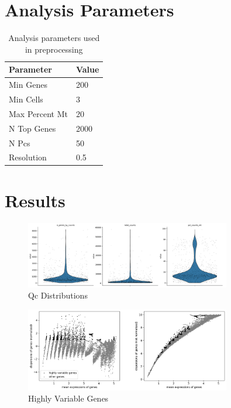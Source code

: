 \documentclass[12pt]{article}
\begin{document}
\section{Analysis Parameters}
\begin{table}[H]
    \centering
    \begin{tabular}{ll}
        \toprule
        \textbf{Parameter} & \textbf{Value} \\
        \midrule
        Min Genes & 200 \\
        Min Cells & 3 \\
        Max Percent Mt & 20 \\
        N Top Genes & 2000 \\
        N Pcs & 50 \\
        Resolution & 0.5 \\

        \bottomrule
    \end{tabular}
    \caption{Analysis parameters used in preprocessing}
    \label{tab:parameters}
\end{table}

\section{{Results}}

    \begin{figure}[H]
        \centering
        \includegraphics[width=0.8\textwidth]{qc_distributions.png}
        \caption{Qc Distributions}
        \label{fig:qc_distributions}
    \end{figure}
    \newpage

    \begin{figure}[H]
        \centering
        \includegraphics[width=0.8\textwidth]{highly_variable_genes.png}
        \caption{Highly Variable Genes}
        \label{fig:highly_variable_genes}
    \end{figure}
    \newpage
\end{document}
